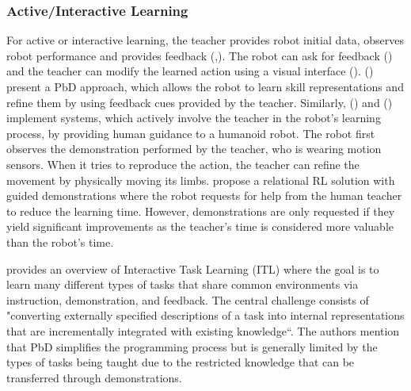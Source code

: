 \subsubsection{Active/Interactive Learning}\label{sssec:Active Learning} 
For active or interactive learning, the teacher provides robot initial data, observes robot performance and provides feedback (\cite{chernova2014robot},\cite{calinon2007active}).
The robot can ask for feedback (\cite{cakmak2012aaai}) and the teacher can modify the learned action using a visual interface (\cite{alexandrova2015roboflow}).
(\cite{nicolescu2003natural}) present a PbD approach, which allows the robot to learn skill representations and refine them by using feedback cues provided by the teacher.
Similarly, (\cite{calinon2007active}) and (\cite{calinon2007incremental}) implement systems, which actively involve the teacher in the robot's learning process, by providing human guidance to a humanoid robot. 
The robot first observes the demonstration performed by the teacher, who is wearing motion sensors. When it tries to reproduce the action, the teacher can refine the movement by physically moving its limbs.
\cite{martinez2017relational} propose a relational RL solution with guided demonstrations where the robot requests for help from the human teacher to reduce the learning time.
However, demonstrations are only requested if they yield significant improvements as the teacher's time is considered more valuable than the robot's time.

\cite{laird2017interactive} provides an overview of Interactive Task Learning (ITL) where the goal is to learn many different types of tasks that share common environments via instruction, demonstration, and feedback. 
The central challenge consists of "converting externally specified descriptions of a task into internal representations that are incrementally integrated with existing knowledge``.
The authors mention that PbD simplifies the programming process but is generally limited by the types of tasks being taught due to the restricted knowledge that can be transferred through demonstrations.




